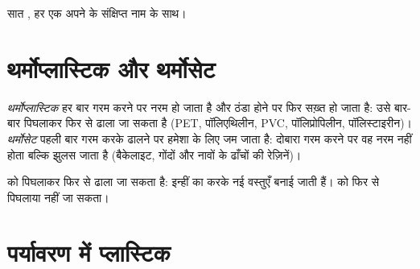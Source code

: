 \begin{omfigure}

{\small सात , हर एक अपने  के संक्षिप्त
नाम के साथ।}
\end{omfigure}

\section{थर्मोप्लास्टिक और थर्मोसेट}

\begin{definition}[थर्मोप्लास्टिक और थर्मोसेट]\label{def:g8:plastics:thermoplastic}
\emph{थर्मोप्लास्टिक} हर बार गरम करने पर नरम हो जाता
है और ठंडा होने पर फिर सख़्त हो जाता है: उसे बार-बार पिघलाकर फिर से ढाला जा
सकता है (PET, पॉलिएथिलीन, PVC, पॉलिप्रोपिलीन, पॉलिस्टाइरीन)।
\emph{थर्मोसेट} पहली बार गरम करके ढालने पर हमेशा के लिए
जम जाता है: दोबारा गरम करने पर वह नरम नहीं होता बल्कि झुलस जाता है (बैकेलाइट,
गोंदों और नावों के ढाँचों की रेज़िनें)।
\end{definition}

\begin{remark}[किनका पुनर्चक्रण हो सकता है]\label{rem:g8:plastics:which}
 को पिघलाकर फिर से ढाला जा सकता है: इन्हीं  का 
करके नई वस्तुएँ बनाई जाती हैं।  को फिर से पिघलाया नहीं जा सकता।
\end{remark}

\section{पर्यावरण में प्लास्टिक}

